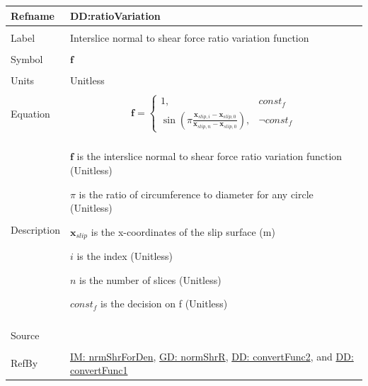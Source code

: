 \documentclass[12pt]{article}
\begin{document}
\noindent \begin{minipage}{\textwidth}
          \begin{tabular}{>{\raggedright}p{}>{\raggedright\arraybackslash}p{}}
          \toprule \textbf{Refname} & \textbf{DD:ratioVariation}
          \label{DD:ratioVariation}
          \\ \midrule \\
          Label & Interslice normal to shear force ratio variation function
          \\ \midrule \\
          Symbol & $\mathbf{f}$
          \\ \midrule \\
          Units & Unitless
          \\ \midrule \\
          Equation & \begin{displaymath}
                     \mathbf{f}=\begin{cases}
                                1, & const_f\\
\sin\left(π \frac{{\mathbf{x}_{slip,i}}-{\mathbf{x}_{slip,0}}}{{\mathbf{x}_{slip,n}}-{\mathbf{x}_{slip,0}}}\right), & \neg{}const_f
                                \end{cases}
                     \end{displaymath}
          \\ \midrule \\
          Description & \begin{symbDescription}
                        \item{$\mathbf{f}$ is the interslice normal to shear force ratio variation function (Unitless)}
                        \item{$π$ is the ratio of circumference to diameter for any circle (Unitless)}
                        \item{${\mathbf{x}_{slip}}$ is the x-coordinates of the slip surface (m)}
                        \item{$i$ is the index (Unitless)}
                        \item{$n$ is the number of slices (Unitless)}
                        \item{$const_f$ is the decision on f (Unitless)}
                        \end{symbDescription}
          \\ \midrule \\
          Source & \cite{fredlund1977}
          \\ \midrule \\
          RefBy & \hyperref[IM:nrmShrForDen]{IM: nrmShrForDen}, \hyperref[GD:normShrR]{GD: normShrR}, \hyperref[DD:convertFunc2]{DD: convertFunc2}, and \hyperref[DD:convertFunc1]{DD: convertFunc1}
          \\ \bottomrule
          \end{tabular}
          \end{minipage}
\par~
\end{document}
